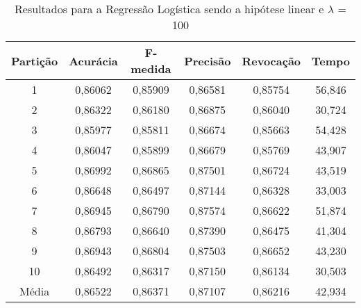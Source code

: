 \begin{table}[h]
\centering
\caption{Resultados para a Regressão Logística sendo a hipótese linear e \(\lambda\) = 100}
\vspace{0.2cm}
\begin{tabular}{c|c|c|c|c|c}
Partição & Acurácia & F-medida & Precisão & Revocação & Tempo \\
\hline
1  & 0,86062 & 0,85909 & 0,86581 & 0,85754 & 56,846 \\      
2  & 0,86322 & 0,86180 & 0,86875 & 0,86040 & 30,724 \\      
3  & 0,85977 & 0,85811 & 0,86674 & 0,85663 & 54,428 \\      
4  & 0,86047 & 0,85899 & 0,86679 & 0,85769 & 43,907 \\      
5  & 0,86992 & 0,86865 & 0,87501 & 0,86724 & 43,519 \\      
6  & 0,86648 & 0,86497 & 0,87144 & 0,86328 & 33,003 \\      
7  & 0,86945 & 0,86790 & 0,87574 & 0,86622 & 51,874 \\    
8  & 0,86793 & 0,86640 & 0,87390 & 0,86475 & 41,304 \\      
9  & 0,86943 & 0,86804 & 0,87503 & 0,86652 & 43,230 \\      
10 & 0,86492 & 0,86317 & 0,87150 & 0,86134 & 30,503 \\
\hline
Média & 0,86522 & 0,86371 & 0,87107 & 0,86216 & 42,934

\end{tabular} 
\label{table:resultadosRL}
\end{table}

